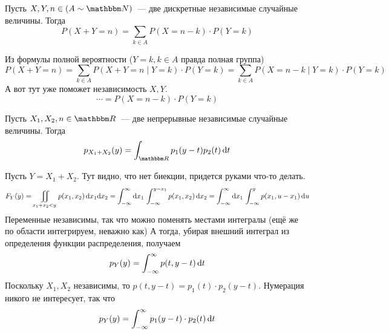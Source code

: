 \documentclass[12pt,ebook]{../../../notes}
\begin{document}
\begin{prop}\label{prop:stat::randsum::discsum}
  Пусть $X,Y,n\in(A\sim\N)$~--- две дискретные независимые случайные величины. Тогда 
  \[
    P(X+Y=n) = \sum_{k\in A} P(X=n-k)\cdot P(Y=k)
  \]
\end{prop}
\begin{itlproof}
  Из формулы полной вероятности ($Y=k, k\in A$ правда полная группа)
  \[
    P(X+Y =n) = \sum_{k\in A} P(X+Y =n \mid Y =k)\cdot P(Y = k) 
    = \sum_{k\in A} P(X= n-k\mid Y=k)\cdot P(Y=k)
  \]
  А вот тут уже поможет независимость $X,Y$.
  \[
    \cdots = P(X=n-k)\cdot P(Y=k)
  \]
\end{itlproof}

\begin{prop}\label{prop:stat::randsum::contsum}
  Пусть $X_1,X_2,n\in\R$~--- две непрерывные независимые случайные величины. Тогда 
  \[
    p_{X_1+X_2}(y) = \int_{\R} p_1(y-t) p_2(t) \,\del t
  \]
\end{prop}
\begin{itlproof}
  Пусть $Y = X_1 + X_2$. Тут видно, что нет биекции, придется руками что-то делать.
  \[
    F_Y(y) = \displaystyle\iint_{x_1+x_2 < y} p(x_1, x_2) \, \mathrm{d} x_1 \mathrm{d} x_2
    = \int_{-\infty}^\infty \mathrm{d} x_1\, \int_{-\infty}^{y-x_1} p(x_1, x_2) \, \mathrm{d} x_2 
    = \int_{-\infty}^\infty \mathrm{d} x_1 \, \int_{-\infty}^y p(x_1, u - x_1) \, \mathrm{d} u
  \]
  Переменные независимы, так что можно поменять местами интегралы (ещё же по области интегрируем,
  неважно как)
  А тогда, убирая внешний интеграл из определения функции распределения, получаем
  \[
    p_Y(y) = \int_{-\infty}^\infty p(t, y-t)\, \mathrm{d} t
  \]
  Поскольку $X_1, X_2$ независимы, то $p(t, y-t) = p_1(t)\cdot p_2(y-t)$. Нумерация никого не
  интересует, так что
  \[
    p_Y(y) =  \int_{-\infty}^\infty p_1(y-t)\cdot p_2(t)\, \mathrm{d} t
  \]
\end{itlproof}
\end{document}
